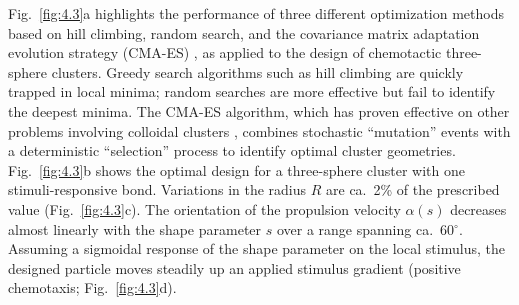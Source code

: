 Fig.\ \ref{fig:4.3}a highlights the performance of three different optimization methods based on hill climbing, random search, and the covariance matrix adaptation evolution strategy (CMA-ES) \autocite{hansen2016cma}, as applied to the design of chemotactic three-sphere clusters.  Greedy search algorithms such as hill climbing are quickly trapped in local minima; random searches are more effective but fail to identify the deepest minima.  The CMA-ES algorithm, which has proven effective on other problems involving colloidal clusters \autocite{miskin2013adapting}, combines stochastic ``mutation'' events with a deterministic ``selection'' process to identify optimal cluster geometries.  Fig.\ \ref{fig:4.3}b shows the optimal design for a three-sphere cluster with one stimuli-responsive bond.  Variations in the radius $R$ are ca.\ 2\% of the prescribed value (Fig.\ \ref{fig:4.3}c).  The orientation of the propulsion velocity $\alpha(s)$ decreases almost linearly with the shape parameter $s$ over a range spanning ca.\ 60$^{\circ}$. Assuming a sigmoidal response of the shape parameter on the local stimulus, the designed particle moves steadily up an applied stimulus gradient (positive chemotaxis; Fig.\ \ref{fig:4.3}d).

